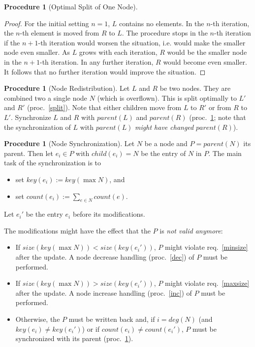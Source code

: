 \documentclass[a4paper, 8pt]{scrartcl}
\theoremstyle{plain}
\theoremstyle{definition}
\newtheorem{proc}[thm]{Procedure}
\theoremstyle{remark}
\begin{document}
\begin{multicols}{2}
\begin{proc}[Optimal Split of One Node]
\begin{proof}
For the initial setting $n = 1$, $L$ contains no elements.
In the $n$-th iteration, the $n$-th element is moved from $R$ to $L$.
The procedure stops in the $n$-th iteration if the $n+1$-th iteration would
worsen the situation, i.e. would make the smaller node even smaller.
As $L$ grows with each iteration, $R$ would be the smaller node in the
$n+1$-th iteration. In any further iteration, $R$ would become even smaller.
It follows that no further iteration would improve the situation.
\end{proof}
\end{proc}


\begin{proc}[Node Redistribution] \label{dist}
Let $L$ and $R$ be two nodes. They are combined two a single node $N$
(which is overflown).
This is split optimally to $L'$ and $R'$ (proc.~\ref{split}).
Note that either children move from $L$ to $R'$ or from $R$ to $L'$.
Synchronize $L$ and $R$ with $parent(L)$ and $parent(R)$ (proc.~\ref{sync};
note that the synchronization of $L$ with $parent(L)$ {\em might have changed}
$parent(R)$).
\end{proc}


\begin{proc}[Node Synchronization] \label{sync}
Let $N$ be a node and $P = parent(N)$ its parent.
Then let \mbox{$e_i \in P$} with \mbox{$child(e_i) = N$} be the entry of
$N$ in $P$.
The main task of the synchronization is to
\begin{itemize}
\item set \mbox{$key(e_i) := key(\max N)$}, and
\item set \mbox{$count(e_i) := \sum_{e \in N} count(e)$}.
\end{itemize}
Let $e_i'$ be the entry $e_i$ before its modifications.

The modifications might have the effect that the $P$ is {\em not valid anymore}:
\begin{itemize}
\item If \mbox{$size(key(\max N)) < size(key(e_i'))$},
	$P$ might violate req.~\ref{minsize} after the update.
	A node decrease handling (proc.~\ref{dec}) of $P$ must be performed.
\item If \mbox{$size(key(\max N)) > size(key(e_i'))$},
	$P$ might violate req.~\ref{maxsize} after the update.
	A node increase handling (proc.~\ref{inc}) of $P$ must be performed.
\item Otherwise, the $P$ must be written back and, if $i = deg(N)$ (and
	$key(e_i) \neq key(e_i')$) or if $count(e_i) \neq count(e_i')$, $P$
	must be synchronized with its parent (proc.~\ref{sync}).
\end{itemize}


\end{proc}
\end{multicols}
\end{document}
